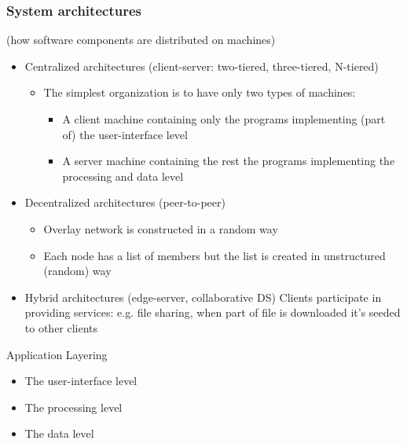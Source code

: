 \subsubsection{System architectures}
(how software components are distributed on machines)
\begin{itemize}
	\item Centralized architectures (client-server: two-tiered, three-tiered, N-tiered)
	\begin{itemize}
		\item The simplest organization is to have only two types of machines:
		\begin{itemize}
			\item A client machine containing only the programs implementing (part of) the user-interface level
			\item A server machine containing the rest
			\subitem the programs implementing the processing and data level
		\end{itemize}
	\end{itemize}
	\item Decentralized architectures (peer-to-peer)
	\begin{itemize}
		\item Overlay network is constructed in a random way
		\item Each node has a list of members but the list is created in unstructured (random) way
	\end{itemize}
	\item Hybrid architectures (edge-server, collaborative DS)
	\subitem Clients participate in providing services: e.g. file sharing, when part of file is downloaded it's seeded to other clients
\end{itemize}

\begin{note}{Application Layering}
	\begin{itemize}
		\item The user-interface level
		\item The processing level
		\item The data level
	\end{itemize}
\end{note}